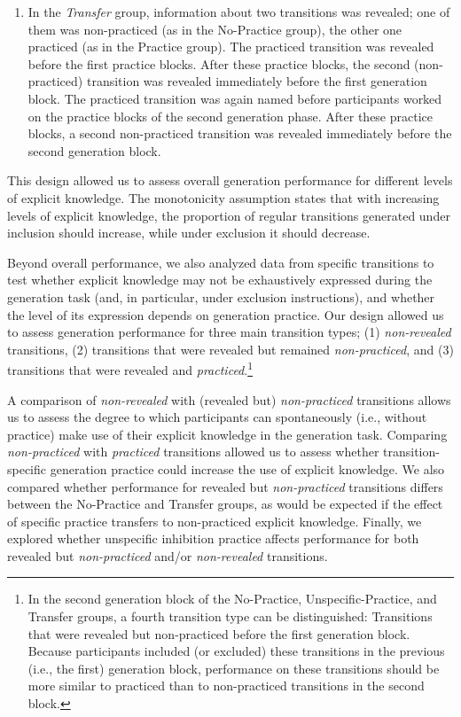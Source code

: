 \documentclass[man]{apa6}
\providecommand{\tightlist}{%
  \setlength{\itemsep}{0pt}\setlength{\parskip}{0pt}}
\theoremstyle{definition}
\theoremstyle{definition}
\theoremstyle{definition}
\theoremstyle{remark}
\begin{document}
\begin{enumerate}
\def\labelenumi{\arabic{enumi}.}
\setcounter{enumi}{4}
\tightlist
\item
  In the \emph{Transfer} group, information about two transitions was
  revealed; one of them was non-practiced (as in the No-Practice group),
  the other one practiced (as in the Practice group). The practiced
  transition was revealed before the first practice blocks. After these
  practice blocks, the second (non-practiced) transition was revealed
  immediately before the first generation block. The practiced
  transition was again named before participants worked on the practice
  blocks of the second generation phase. After these practice blocks, a
  second non-practiced transition was revealed immediately before the
  second generation block.
\end{enumerate}

This design allowed us to assess overall generation performance for
different levels of explicit knowledge. The monotonicity assumption
states that with increasing levels of explicit knowledge, the proportion
of regular transitions generated under inclusion should increase, while
under exclusion it should decrease.

Beyond overall performance, we also analyzed data from specific
transitions to test whether explicit knowledge may not be exhaustively
expressed during the generation task (and, in particular, under
exclusion instructions), and whether the level of its expression depends
on generation practice. Our design allowed us to assess generation
performance for three main transition types; (1) \emph{non-revealed}
transitions, (2) transitions that were revealed but remained
\emph{non-practiced}, and (3) transitions that were revealed and
\emph{practiced}.\footnote{In the second generation block of the
  No-Practice, Unspecific-Practice, and Transfer groups, a fourth
  transition type can be distinguished: Transitions that were revealed
  but non-practiced before the first generation block. Because
  participants included (or excluded) these transitions in the previous
  (i.e., the first) generation block, performance on these transitions
  should be more similar to practiced than to non-practiced transitions
  in the second block.}

A comparison of \emph{non-revealed} with (revealed but)
\emph{non-practiced} transitions allows us to assess the degree to which
participants can spontaneously (i.e., without practice) make use of
their explicit knowledge in the generation task. Comparing
\emph{non-practiced} with \emph{practiced} transitions allowed us to
assess whether transition-specific generation practice could increase
the use of explicit knowledge. We also compared whether performance for
revealed but \emph{non-practiced} transitions differs between the
No-Practice and Transfer groups, as would be expected if the effect of
specific practice transfers to non-practiced explicit knowledge.
Finally, we explored whether unspecific inhibition practice affects
performance for both revealed but \emph{non-practiced} and/or
\emph{non-revealed} transitions.
\end{document}
